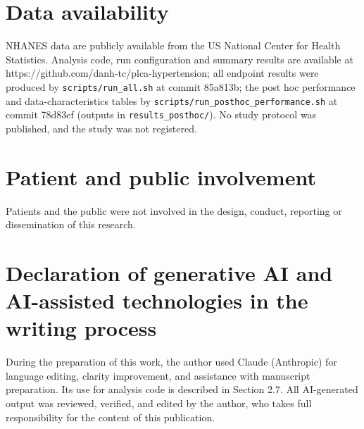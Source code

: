 \documentclass[preprint,review,12pt,times]{elsarticle}
\begin{document}
\section*{Data availability}

NHANES data are publicly available from the US National Center for
Health Statistics. Analysis code, run configuration and summary results
are available at https://github.com/danh-tc/plca-hypertension; all
endpoint results were produced by \texttt{scripts/\allowbreak{}run\_\allowbreak{}all.sh} at commit
85a813b; the post hoc performance and data-characteristics tables by
\texttt{scripts/\allowbreak{}run\_\allowbreak{}posthoc\_\allowbreak{}performance.sh} at commit 78d83ef (outputs
in \texttt{results\_\allowbreak{}posthoc/\allowbreak{}}). No study protocol was published, and the
study was not registered.

\section*{Patient and public involvement}

Patients and the public were not involved in the design, conduct,
reporting or dissemination of this research.

\section*{Declaration of generative AI and AI-assisted technologies in
the writing process}

During the preparation of this work, the author used Claude (Anthropic)
for language editing, clarity improvement, and assistance with
manuscript preparation. Its use for analysis code is described in
Section 2.7. All AI-generated output was reviewed, verified, and edited
by the author, who takes full responsibility for the content of this
publication.
\end{document}
